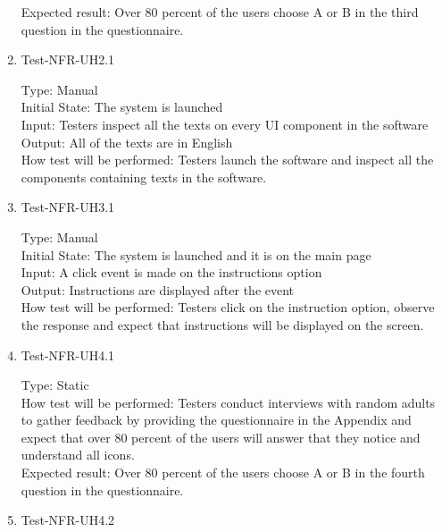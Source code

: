 \documentclass[12pt, titlepage]{article}
\begin{document}
\begin{enumerate}
Expected result: Over 80 percent of the users choose A or B in the third question in the questionnaire.

\item{Test-NFR-UH2.1\\}

Type: Manual\\

Initial State: The system is launched\\

Input: Testers inspect all the texts on every UI component in the software \\

Output: All of the texts are in English\\

How test will be performed: Testers launch the software and inspect all the components containing texts in the software.

\item{Test-NFR-UH3.1\\}

Type: Manual\\

Initial State: The system is launched and it is on the main page\\

Input: A click event is made on the instructions option\\

Output: Instructions are displayed after the event\\

How test will be performed: Testers click on the instruction option, observe the response and expect that instructions will be displayed on the screen. \\

\item{Test-NFR-UH4.1\\}

Type: Static\\

How test will be performed: Testers conduct interviews with random adults to gather feedback by providing the questionnaire in the Appendix and expect that over 80 percent of the users will answer that they notice and understand all icons.\\

Expected result: Over 80 percent of the users choose A or B in the fourth question in the questionnaire.

\item{Test-NFR-UH4.2\\}


\end{enumerate}
\end{document}
